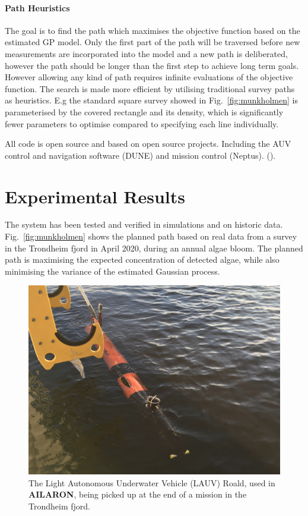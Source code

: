 \documentclass[conference]{IEEEtran}
\def\proje{{\textbf{AILARON}}}
\newcommand{\cmt}[1]{{\color{red}{#1}}}
\begin{document}
\paragraph{Path Heuristics}

The goal is to find the path which maximises the objective function
based on the estimated GP model.  Only the first part of the path will
be traversed before new measurements are incorporated into the model
and a new path is deliberated, however the path should be longer than
the first step to achieve long term goals.  However allowing any kind
of path requires infinite evaluations of the objective function.  The
search is made more efficient by utilising traditional survey paths as
heuristics. E.g the standard square survey showed in
Fig.~\ref{fig:munkholmen} is parameterised by the covered rectangle
and its density, which is significantly fewer parameters to optimise
compared to specifying each line individually.

All code is open source and based on open source projects. Including
the AUV control and navigation software (DUNE) and mission control
(Neptus). (\cmt{Cite}).

\section{Experimental Results}

The system has been tested and verified in simulations and on historic
data. Fig.~\ref{fig:munkholmen} shows the planned path based on real
data from a survey in the Trondheim fjord in April 2020, during an
annual algae bloom. The planned path is maximising the expected
concentration of detected algae, while also minimising the variance of
the estimated Gaussian process.

\begin{figure}[tbp]
  \centering
  \includegraphics[width=\linewidth]{figures/Roald.jpeg}
  \caption{The Light Autonomous Underwater Vehicle (LAUV) Roald, used in
    \proje, being picked up at the end of a mission in the Trondheim
    fjord.}
  \label{fig:roald}
\end{figure}
\end{document}
